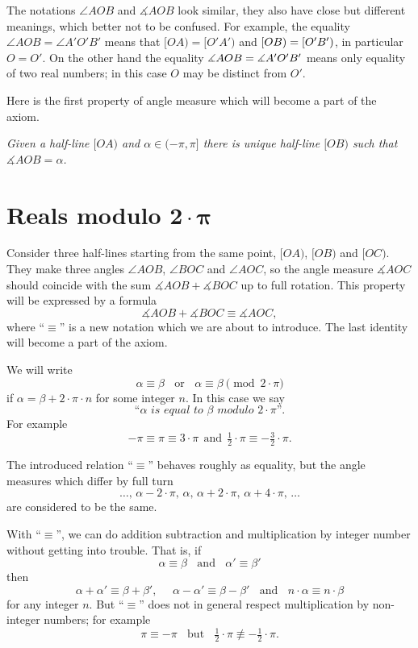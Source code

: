 The notations $\angle AOB$ and $\measuredangle AOB$ look similar,
they also have close but different meanings, 
which better not to be confused.
For example, the equality 
$\angle AOB=\angle A'O'B'$
means that
$[OA)=[O'A')$ and $[OB)\z=[O'B')$,
in particular $O=O'$.
On the other hand the equality 
$\measuredangle AOB\z=\measuredangle A'O'B'$ 
means only equality of two real numbers;
in this case $O$ may be distinct from $O'$.

Here is the first property of angle measure which will become a part of the axiom.

\textit{Given a half-line $[O A)$ and $\alpha\in(-\pi,\pi]$ there is unique  half-line $[O B)$ such that $\measuredangle A O B= \alpha$.}





\section*{Reals modulo $\bm{2\cdot\pi}$}

Consider three half-lines starting from the same point,
 $[O A)$, $[O B)$ and $[O C)$.
They make three angles $\angle A O B$, $\angle B O C$ and $\angle A O C$,
so the angle measure $\measuredangle A O C$ should coincide with
the sum $\measuredangle A O B+\measuredangle B O C$ up to full rotation.
This property will be expressed by a formula 
$$\measuredangle A O B+\measuredangle B O C\equiv \measuredangle A O C,$$
where ``$\equiv$'' is a new notation which we are about to introduce.
The last identity will become a part of the axiom.

We will write 
$$\alpha\equiv\beta\ \ \ \ \text{or}\ \ \ \  \alpha\equiv\beta\pmod{2\cdot\pi}$$ if $\alpha=\beta+2\cdot\pi\cdot n$
for some integer $n$.
In this case we say 
$$\textit{``$\alpha$ is equal to $\beta$ modulo $2\cdot\pi$''}.$$
For example 
$$-\pi\equiv \pi\equiv 3\cdot\pi\ \  \text{and}
\ \ \tfrac12\cdot\pi\equiv-\tfrac32\cdot\pi.$$

The introduced relation ``$\equiv$'' behaves roughly as equality, 
but the angle measures which differ by full turn 
\[\dots,\,\alpha-2\cdot\pi,\, \alpha,\, \alpha+2\cdot\pi,\, \alpha+4\cdot\pi,\,\dots\] 
are considered to be the same.

With ``$\equiv$'', we can do addition subtraction and multiplication by integer number without getting into trouble.
That is, if
$$\alpha\equiv\beta\ \ \ \ \text{and}\ \ \ \ \alpha'\equiv \beta'$$ 
then
$$\alpha+\alpha'\equiv\beta+\beta',\ \ \ \ \ \ \alpha-\alpha'\equiv \beta-\beta'\ \ \ \ 
\text{and}\ \ \ \ n\cdot\alpha\equiv n\cdot\beta$$
for any integer $n$.
But ``$\equiv$'' does not in general respect multiplication by non-integer numbers; for example 
$$\pi\equiv -\pi\ \ \ \ \text{but}\ \ \ \ \tfrac12\cdot\pi\not\equiv -\tfrac12\cdot\pi.$$ 

